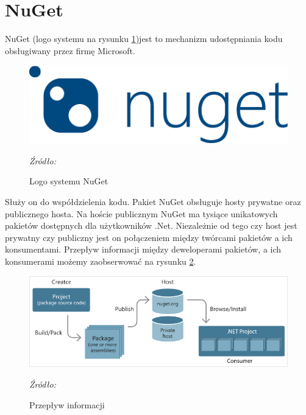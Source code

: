 \documentclass[12pt,oneside]{report}
\begin{document}
\section{NuGet}
NuGet (logo systemu na rysunku \ref{nugetLogo})jest to mechanizm udostępniania kodu obsługiwany przez firmę Microsoft. 
\begin{figure}[H]
	\centering
	\includegraphics[scale=0.25]{nugetLogo}
	\caption{Logo systemu NuGet}
	\textit{Źródło: \cite{Nuget}}
	\label{nugetLogo}
\end{figure}
Służy on do współdzielenia kodu. Pakiet NuGet obsługuje hosty prywatne oraz publicznego hosta. Na hoście publicznym NuGet ma tysiące unikatowych pakietów dostępnych dla użytkowników .Net. Niezależnie od tego czy host jest prywatny czy publiczny jest on połączeniem między twórcami pakietów a ich konsumentami. Przepływ informacji między deweloperami pakietów, a ich konsumerami możemy zaobserwować na rysunku \ref{NugetFlow}.
\begin{figure}[H]
	\centering
	\includegraphics[scale=0.75]{nugetFlow}
	\caption{Przepływ informacji}
	\textit{Źródło: \cite{Nuget}}
	\label{NugetFlow}
\end{figure}
\end{document}
